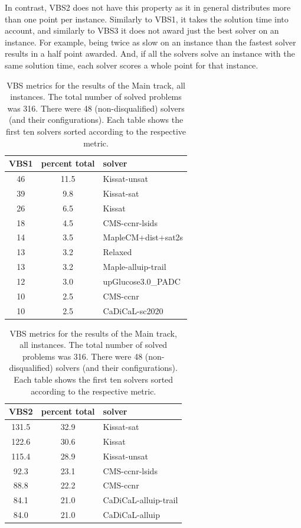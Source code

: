 \documentclass{elsarticle}
\begin{document}
In contrast, VBS2 does not have this property as it in general distributes more than one point per instance.
Similarly to VBS1, it takes the solution time into account,
and similarly to VBS3 it does not award just the best solver on an instance.
For example, being twice as slow on an instance than the fastest solver results in a half point awarded.
And, if all the solvers solve an instance with the same solution time,
each solver scores a whole point for that instance. 

\begin{table}
\caption{VBS metrics for the results of the Main track, all instances. 
The total number of solved problems was 316. 
There were 48 (non-disqualified) solvers (and their configurations).
Each table shows the first ten solvers sorted according to the respective metric.}
\label{tab:vbsMainALL}
\begin{center}
\begin{tabular}{ccl}
VBS1 & percent total & solver \\
\hline
46 & 11.5 & Kissat-unsat \\
39 & \phantom{0}9.8 & Kissat-sat \\
26 & \phantom{0}6.5 & Kissat \\
18 & \phantom{0}4.5 & CMS-ccnr-lsids \\
14 & \phantom{0}3.5 & MapleCM+dist+sat2s \\
13 & \phantom{0}3.2 & Relaxed \\
13 & \phantom{0}3.2 & Maple-alluip-trail \\
12 & \phantom{0}3.0 & upGlucose3.0\_PADC \\
10 & \phantom{0}2.5 & CMS-ccnr \\
10 & \phantom{0}2.5 & CaDiCaL-sc2020 \\
\end{tabular}
\end{center}
\begin{center}
\begin{tabular}{ccl}
VBS2 & percent total & solver \\
\hline
131.5 & 32.9 & Kissat-sat \\
122.6 & 30.6 & Kissat \\
115.4 & 28.9 & Kissat-unsat \\
\phantom{0}92.3 & 23.1 & CMS-ccnr-lsids \\
\phantom{0}88.8 & 22.2 & CMS-ccnr \\
\phantom{0}84.1 & 21.0 & CaDiCaL-alluip-trail \\
\phantom{0}84.0 & 21.0 & CaDiCaL-alluip \\

\end{tabular}
\end{center}
\end{table}
\end{document}
